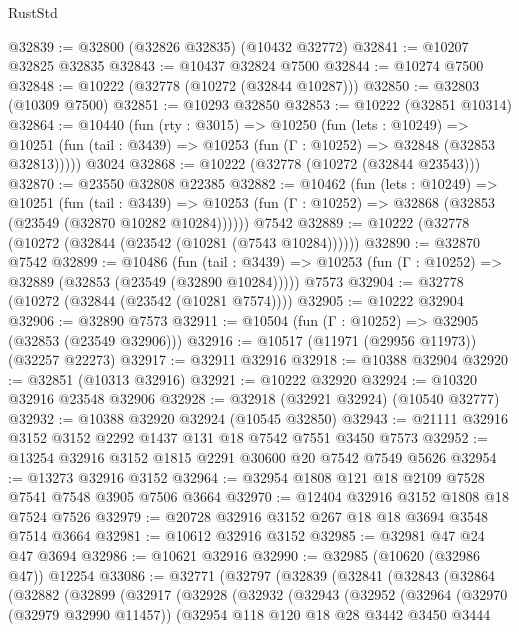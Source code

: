 \begin{lexlean}{RustStd}
\begin{coremodule}
@32839 := @32800 (@32826 @32835) (@10432 @32772)
@32841 := @10207 @32825 @32835
@32843 := @10437 @32824 @7500
@32844 := @10274 @7500
@32848 := @10222 (@32778 (@10272 (@32844 @10287)))
@32850 := @32803 (@10309 @7500)
@32851 := @10293 @32850
@32853 := @10222 (@32851 @10314)
@32864 := @10440
    (fun (rty : @3015) =>
    @10250
      (fun (lets : @10249) =>
      @10251 (fun (tail : @3439) => @10253 (fun (Γ : @10252) => @32848 (@32853 @32813)))))
    @3024
@32868 := @10222 (@32778 (@10272 (@32844 @23543)))
@32870 := @23550 @32808 @22385
@32882 := @10462
    (fun (lets : @10249) =>
    @10251
      (fun (tail : @3439) =>
      @10253 (fun (Γ : @10252) => @32868 (@32853 (@23549 (@32870 @10282 @10284))))))
    @7542
@32889 := @10222 (@32778 (@10272 (@32844 (@23542 (@10281 (@7543 @10284))))))
@32890 := @32870 @7542
@32899 := @10486
    (fun (tail : @3439) => @10253 (fun (Γ : @10252) => @32889 (@32853 (@23549 (@32890 @10284)))))
    @7573
@32904 := @32778 (@10272 (@32844 (@23542 (@10281 @7574))))
@32905 := @10222 @32904
@32906 := @32890 @7573
@32911 := @10504 (fun (Γ : @10252) => @32905 (@32853 (@23549 @32906)))
@32916 := @10517 (@11971 (@29956 @11973)) (@32257 @22273)
@32917 := @32911 @32916
@32918 := @10388 @32904
@32920 := @32851 (@10313 @32916)
@32921 := @10222 @32920
@32924 := @10320 @32916 @23548 @32906
@32928 := @32918 (@32921 @32924) (@10540 @32777)
@32932 := @10388 @32920 @32924 (@10545 @32850)
@32943 := @21111 @32916 @3152 @3152 @2292 @1437 @131 @18 @7542 @7551 @3450 @7573
@32952 := @13254 @32916 @3152 @1815 @2291 @30600 @20 @7542 @7549 @5626
@32954 := @13273 @32916 @3152
@32964 := @32954 @1808 @121 @18 @2109 @7528 @7541 @7548 @3905 @7506 @3664
@32970 := @12404 @32916 @3152 @1808 @18 @7524 @7526
@32979 := @20728 @32916 @3152 @267 @18 @18 @3694 @3548 @7514 @3664
@32981 := @10612 @32916 @3152
@32985 := @32981 @47 @24 @47 @3694
@32986 := @10621 @32916
@32990 := @32985 (@10620 (@32986 @47)) @12254
@33086 := @32771
    (@32797
      (@32839
        (@32841
          (@32843
            (@32864
              (@32882
                (@32899
                  (@32917
                    (@32928
                      (@32932
                        (@32943
                          (@32952
                            (@32964
                              (@32970 (@32979 @32990 @11457))
                              (@32954
                                @118
                                @120
                                @18
                                @28
                                @3442
                                @3450
                                @3444

\end{coremodule}
\end{lexlean}
